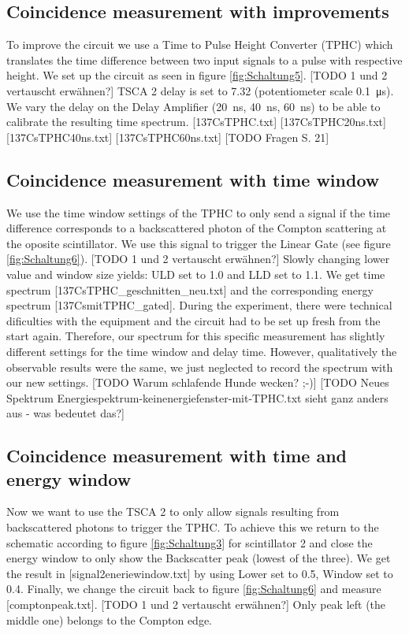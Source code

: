 \subsection{Coincidence measurement with improvements}
%
To improve the circuit we use a Time to Pulse Height Converter (TPHC) which translates the time difference between two input signals to a pulse with respective height.
We set up the circuit as seen in figure \ref{fig:Schaltung5}.
[TODO 1 und 2 vertauscht erwähnen?]
TSCA 2 delay is set to 7.32 (potentiometer scale \SI{0.1}{\micro\second}).
We vary the delay on the Delay Amplifier (\SI{20}{\nano\second}, \SI{40}{\nano\second}, \SI{60}{\nano\second}) to be able to calibrate the resulting time spectrum.
[137CsTPHC.txt]
[137CsTPHC20ns.txt]
[137CsTPHC40ns.txt]
[137CsTPHC60ns.txt]
[TODO Fragen S. 21]
%
\subsection{Coincidence measurement with time window}
%
We use the time window settings of the TPHC to only send a signal if the time difference corresponds to a backscattered photon of the Compton scattering at the oposite scintillator.
We use this signal to trigger the Linear Gate (see figure \ref{fig:Schaltung6}).
[TODO 1 und 2 vertauscht erwähnen?]
Slowly changing lower value and window size yields: ULD set to 1.0 and LLD set to 1.1.
We get time spectrum [137CsTPHC_geschnitten_neu.txt] and the corresponding energy spectrum [137CsmitTPHC_gated].
During the experiment, there were technical dificulties with the equipment and the circuit had to be set up fresh from the start again.
Therefore, our spectrum for this specific measurement has slightly different settings for the time window and delay time.
However, qualitatively the observable results were the same, we just neglected to record the spectrum with our new settings.
[TODO Warum schlafende Hunde wecken? ;-)]
[TODO Neues Spektrum Energiespektrum-keinenergiefenster-mit-TPHC.txt sieht ganz anders aus - was bedeutet das?]
%
\subsection{Coincidence measurement with time and energy window}
%
Now we want to use the TSCA 2 to only allow signals resulting from backscattered photons to trigger the TPHC.
To achieve this we return to the schematic according to figure \ref{fig:Schaltung3} for scintillator 2 and close the energy window to only show the Backscatter peak (lowest of the three).
We get the result in [signal2eneriewindow.txt] by using Lower set to 0.5, Window set to 0.4.
Finally, we change the circuit back to figure \ref{fig:Schaltung6} and measure [comptonpeak.txt].
[TODO 1 und 2 vertauscht erwähnen?]
Only peak left (the middle one) belongs to the Compton edge.
%
